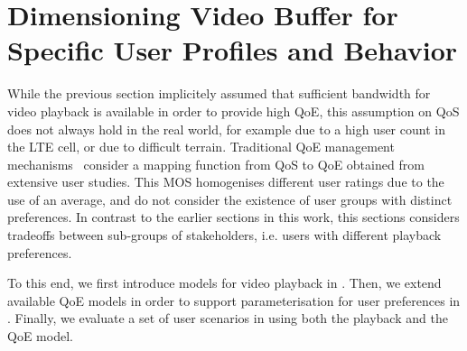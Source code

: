 \section{Dimensioning Video Buffer for Specific User Profiles and Behavior}\label{sec:application:qoe_user_behaviour}

\newcommand{\stallingRatio}{\ensuremath{R}\xspace}
\newcommand{\stallingDuration}{\ensuremath{L}\xspace}
\newcommand{\numberStallingEvents}{\ensuremath{N^*}\xspace}
\newcommand{\stallingFrequency}{\ensuremath{F}\xspace}
\newcommand{\meanStallingEventDuration}{\ensuremath{L}\xspace}

\newcommand{\networkBandwidth}{\ensuremath{\lambda}\xspace}
\newcommand{\playbackRate}{\ensuremath{\mu}\xspace}

\newcommand{\meanBusy}{\ensuremath{B}\xspace}
\newcommand{\meanIdle}{\ensuremath{L}\xspace}
\newcommand{\numberFrames}{\ensuremath{Z}\xspace}
\newcommand{\videoDownloadTime}{\ensuremath{t_Z}\xspace}

\newcommand{\watchLater}{\emph{Watch Later}\xspace}
\newcommand{\watchNow}{\emph{Watch Now}\xspace}
\newcommand{\videoBrowsing}{\emph{Video Browsing}\xspace}

While the previous section implicitely assumed that sufficient bandwidth for video playback is available in order to provide high \gls{QoE}, this assumption on \gls{QoS} does not always hold in the real world, for example due to a high user count in the \gls{LTE} cell, or due to difficult terrain.
Traditional \gls{QoE} management mechanisms~\cite{Hossfeld2013c} consider a mapping function from \gls{QoS} to \gls{QoE} obtained from extensive user studies.
This \gls{MOS} homogenises different user ratings due to the use of an average, and do not consider the existence of user groups with distinct preferences.
In contrast to the earlier sections in this work, this sections considers tradeoffs between sub-groups of stakeholders, i.e. users with different playback preferences.

To this end, we first introduce models for video playback in .
Then, we extend available \gls{QoE} models in order to support parameterisation for user preferences in .
Finally, we evaluate a set of user scenarios in  using both the playback and the \gls{QoE} model.



